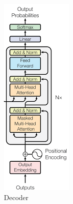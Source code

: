 \begin{figure}[h]
	\centering
	\begin{minipage}[b]{0.25\textwidth}
		\centering
		\includegraphics[width=\textwidth]{transformer_images/decoder.png}
		\caption{Decoder}
		\label{fig:Decoder}
	\end{minipage}
	\hfill
\end{figure}

